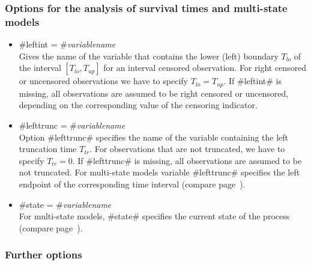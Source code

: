 \subsubsection*{Options for the analysis of survival times and multi-state models}
\label{remlest_survival_options}

\begin{itemize}
\item #leftint = #{\em variablename}\\
Gives the name of the variable that contains the lower (left)
boundary $T_{lo}$ of the interval $[T_{lo},T_{up}]$ for an interval
censored observation. For right censored or uncensored observations
we have to specify $T_{lo}=T_{up}$. If #leftint# is missing, all
observations are assumed to be right censored or uncensored,
depending on the corresponding value of the censoring indicator.

\item #lefttrunc = #{\em variablename}\\
Option #lefttrunc# specifies the name of the variable containing the
left truncation time $T_{tr}$. For observations that are not
truncated, we have to specify $T_{tr}=0$. If #lefttrunc# is missing,
all observations are assumed to be not truncated. For multi-state
models variable #lefttrunc# specifies the left endpoint of the
corresponding time interval (compare page~\pageref{msm_code}).

\item #state = #{\em variablename}\\
For multi-state models, #state# specifies the current state of the
process (compare page~\pageref{msm_code}).
\end{itemize}

\subsubsection*{Further options} \label{remlreg_further_options}


